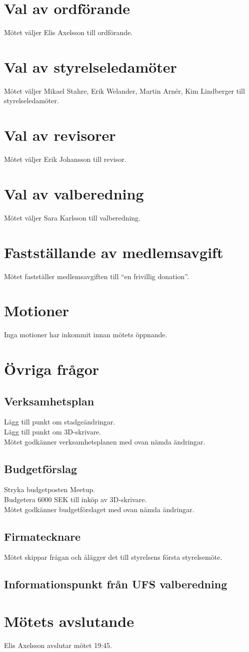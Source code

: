 \documentclass[a4paper,11pt,oneside]{article}
\begin{document}
\section{Val av ordförande}
Mötet väljer Elis Axelsson till ordförande.

\section{Val av styrelseledamöter}
Mötet väljer Mikael Stahre, Erik Welander, Martin Arnér, Kim Lindberger till styrelseledamöter.

\section{Val av revisorer}
Mötet väljer Erik Johansson till revisor.

\section{Val av valberedning}
Mötet väljer Sara Karlsson till valberedning.

\section{Fastställande av medlemsavgift}
Mötet fastställer medlemsavgiften till ``en frivillig donation''.

\section{Motioner}
Inga motioner har inkommit innan mötets öppnande.

\section{Övriga frågor}
\subsection{Verksamhetsplan}
Lägg till punkt om stadgeändringar. \\
Lägg till punkt om 3D-skrivare. \\
Mötet godkänner verksamhetsplanen med ovan nämda ändringar.

\subsection{Budgetförslag}
Stryka budgetposten Meetup. \\
Budgetera 6000 SEK till inköp av 3D-skrivare. \\
Mötet godkänner budgetförslaget med ovan nämda ändringar.

\subsection{Firmatecknare}
Mötet skippar frågan och ålägger det till styrelsens första styrelsemöte.

\subsection{Informationspunkt från UFS valberedning}

\section{Mötets avslutande}
Elis Axelsson avslutar mötet 19:45.
\end{document}
